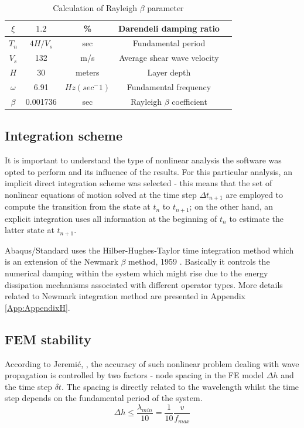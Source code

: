 	\begin{table}[h!]
		\centering
		\begin{tabular}{|c|c|c|c|c|}
			\hline $\xi$         &       $1.2$    &  \%    &  Darendeli damping ratio      \\ 
			\hline $T_n$    & $4H/V_s$ &  sec &  Fundamental period\\ 
			\hline $V_s$  & 132  &  m/s &  Average shear wave velocity\\ 
			\hline $H$ & 30 &  meters &  Layer depth\\
			\hline $\omega$ & 6.91 & $Hz (sec^-1)$ & Fundamental frequency\\
			\hline $\beta$ & 0.001736 & sec & Rayleigh $\beta$ coefficient\\
			\hline
		\end{tabular} 
		\caption{Calculation of Rayleigh $\beta$ parameter}
		\label{beta_param}
	\end{table}
	
	\subsection{Integration scheme} \label{sectionNew}
	It is important to understand the type of nonlinear analysis the software was opted to perform and its influence of the results. For this particular analysis, an implicit direct integration scheme was selected - this means that the set of nonlinear equations of motion solved at the time step $\Delta t_{n+1}$ are employed to compute the transition from the state at $t_n$ to $t_{n+1}$; on the other hand, an explicit integration uses all information at the beginning of $t_n$ to estimate the latter state at $t_{n+1}$.
	
	Abaqus/Standard uses the Hilber-Hughes-Taylor time integration method \cite{hilber1977improved} which is an extension of the Newmark $\beta$ method, 1959 \cite{newmark1959method}. Basically it controls the numerical damping within the system which might rise due to the energy dissipation mechanisms associated with different operator types. More details related to Newmark integration method are presented in Appendix \ref{App:AppendixH}.
	
	\subsection{FEM stability}
	According to Jeremi\'{c}, \cite{jeremic2009time}, the accuracy of such nonlinear problem dealing with wave propagation is controlled by two factors - node spacing in the FE model $\Delta h$ and the time step $\delta t$. The spacing is directly related to the wavelength whilst the time step depends on the fundamental period of the system. 
	\begin{equation}
	\Delta h\leq\frac{\lambda_{min}}{10}=\frac{1}{10} \frac{v}{f_{max}}
	\end{equation}
	
